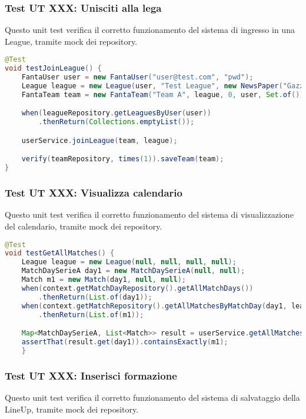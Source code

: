 \subsubsection{Test UT XXX: Unisciti alla lega} \label{UT7}

Questo unit test verifica il corretto funzionamento del sistema di ingresso in una League,
tramite mock dei repository.

\begin{lstlisting}[language=Java]
@Test
void testJoinLeague() {
	FantaUser user = new FantaUser("user@test.com", "pwd");
	League league = new League(user, "Test League", new NewsPaper("Gazzetta"), "L002");
	FantaTeam team = new FantaTeam("Team A", league, 0, user, Set.of());

	when(leagueRepository.getLeaguesByUser(user))
        .thenReturn(Collections.emptyList());

	userService.joinLeague(team, league);

	verify(teamRepository, times(1)).saveTeam(team);
}
\end{lstlisting}


\subsubsection{Test UT XXX: Visualizza calendario} \label{UT8}

Questo unit test verifica il corretto funzionamento del sistema di visualizzazione del calendario,
tramite mock dei repository.

\begin{lstlisting}[language=Java]
@Test
void testGetAllMatches() {
	League league = new League(null, null, null, null);
	MatchDaySerieA day1 = new MatchDaySerieA(null, null);
	Match m1 = new Match(day1, null, null);
	when(context.getMatchDayRepository().getAllMatchDays())
        .thenReturn(List.of(day1));
	when(context.getMatchRepository().getAllMatchesByMatchDay(day1, league))
        .thenReturn(List.of(m1));

	Map<MatchDaySerieA, List<Match>> result = userService.getAllMatches(league);
	assertThat(result.get(day1)).containsExactly(m1);
	}
\end{lstlisting}


\subsubsection{Test UT XXX: Inserisci formazione} \label{UT9}

Questo unit test verifica il corretto funzionamento del sistema di salvataggio della LineUp,
tramite mock dei repository.

